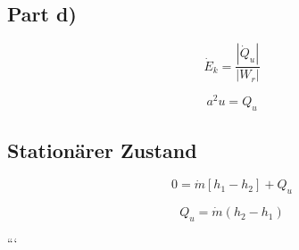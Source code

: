 \subsection*{Part d)}

\[
\dot{E}_k = \frac{\left| \dot{Q}_u \right|}{\left| W_r \right|}
\]

\[
a^2 u = Q_u
\]

\subsection*{Stationärer Zustand}

\[
0 = \dot{m} \left[ h_1 - h_2 \right] + Q_u
\]

\[
Q_u = \dot{m} \left( h_2 - h_1 \right)
\]

```